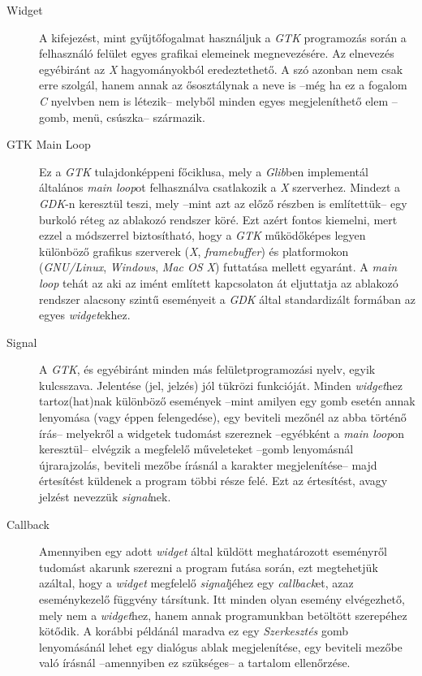 \documentclass[a4paper,10pt]{article}
\begin{document}
\begin{description}
 \item[Widget] A kifejezést, mint gyűjtőfogalmat használjuk a \textit{GTK} programozás során a felhasználó felület egyes grafikai elemeinek megnevezésére. Az elnevezés egyébiránt az \textit{X} hagyományokból eredeztethető. A szó azonban nem csak erre szolgál, hanem annak az ősosztálynak a neve is --még ha ez a fogalom \textit{C} nyelvben nem is létezik-- melyből minden egyes megjeleníthető elem --gomb, menü, csúszka-- származik.

 \item[GTK Main Loop] Ez a \textit{GTK} tulajdonképpeni főciklusa, mely a \textit{Glib}ben implementál általános \textit{main loop}ot felhasználva csatlakozik a \textit{X} szerverhez. Mindezt a \textit{GDK}-n keresztül teszi, mely --mint azt az előző részben is említettük-- egy burkoló réteg az ablakozó rendszer köré. Ezt azért fontos kiemelni, mert ezzel a módszerrel biztosítható, hogy a \textit{GTK} működőképes legyen különböző grafikus szerverek (\textit{X}, \textit{framebuffer}) és platformokon (\textit{GNU/Linux}, \textit{Windows}, \textit{Mac OS X}) futtatása mellett egyaránt. A \textit{main loop} tehát az aki az imént említett kapcsolaton át eljuttatja az ablakozó rendszer alacsony szintű eseményeit a \textit{GDK} által standardizált formában az egyes \textit{widget}ekhez.

 \item[Signal] A \textit{GTK}, és egyébiránt minden más felületprogramozási nyelv, egyik kulcsszava. Jelentése (jel, jelzés) jól tükrözi funkcióját. Minden \textit{widget}hez tartoz(hat)nak különböző események --mint amilyen egy gomb esetén annak lenyomása (vagy éppen felengedése), egy beviteli mezőnél az abba történő írás-- melyekről a widgetek tudomást szereznek --egyébként a \textit{main loop}on keresztül-- elvégzik a megfelelő műveleteket --gomb lenyomásnál újrarajzolás, beviteli mezőbe írásnál a karakter megjelenítése-- majd értesítést küldenek a program többi része felé. Ezt az értesítést, avagy jelzést nevezzük \textit{signal}nek.

 \item[Callback] Amennyiben egy adott \textit{widget} által küldött meghatározott eseményről tudomást akarunk szerezni a program futása során, ezt megtehetjük azáltal, hogy a \textit{widget} megfelelő \textit{signal}jéhez egy \textit{callback}et, azaz eseménykezelő függvény társítunk. Itt minden olyan esemény elvégezhető, mely nem a \textit{widget}hez, hanem annak programunkban betöltött szerepéhez kötődik. A korábbi példánál maradva ez egy \textit{Szerkesztés} gomb lenyomásánál lehet egy dialógus ablak megjelenítése, egy beviteli mezőbe való írásnál --amennyiben ez szükséges-- a tartalom ellenőrzése.
\end{description}
\end{document}
